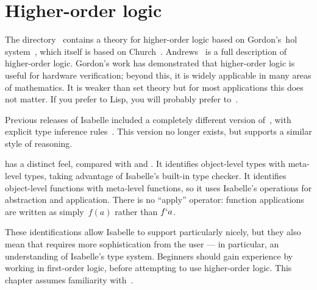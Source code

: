 \chapter{Higher-order logic}
The directory~ contains a theory for higher-order logic
based on Gordon's~{\sc hol} system~\cite{gordon88a}, which itself is based on
Church~\cite{church40}.  Andrews~\cite{andrews86} is a full description of
higher-order logic.  Gordon's work has demonstrated that higher-order logic
is useful for hardware verification; beyond this, it is widely applicable
in many areas of mathematics.  It is weaker than {\ZF} set theory but for
most applications this does not matter.  If you prefer {\ML} to Lisp, you
will probably prefer {\HOL} to~{\ZF}.

Previous releases of Isabelle included a completely different version
of~{\HOL}, with explicit type inference rules~\cite{paulson-COLOG}.  This
version no longer exists, but  supports a similar style of
reasoning.

{\HOL} has a distinct feel, compared with {\ZF} and {\CTT}.  It
identifies object-level types with meta-level types, taking advantage of
Isabelle's built-in type checker.  It identifies object-level functions
with meta-level functions, so it uses Isabelle's operations for abstraction
and application.  There is no ``apply'' operator: function applications are
written as simply~$f(a)$ rather than $f{\tt`}a$.

These identifications allow Isabelle to support {\HOL} particularly nicely,
but they also mean that {\HOL} requires more sophistication from the user
--- in particular, an understanding of Isabelle's type system.  Beginners
should gain experience by working in first-order logic, before attempting
to use higher-order logic.  This chapter assumes familiarity with~{\FOL{}}.


